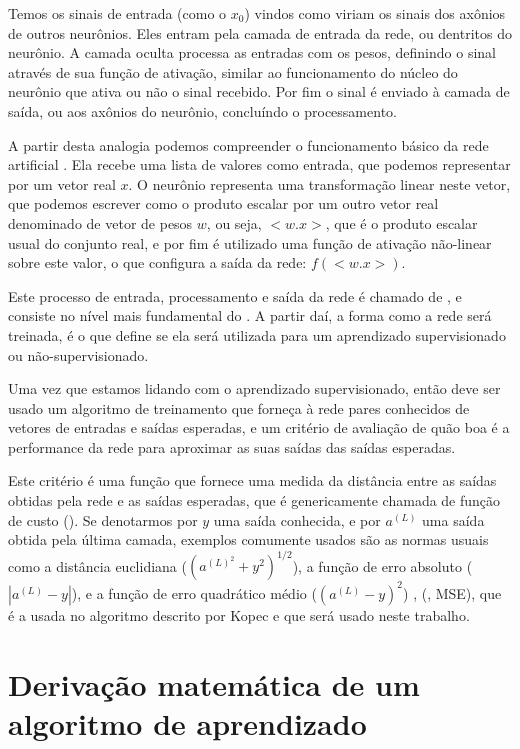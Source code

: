 Temos os sinais de entrada (como o $x_0$) vindos como viriam os sinais dos axônios de outros neurônios. Eles entram pela camada de entrada da rede, ou dentritos do neurônio. A camada oculta processa as entradas com os pesos, definindo o sinal através de sua função de ativação, similar ao funcionamento do núcleo do neurônio que ativa ou não o sinal recebido. Por fim o sinal é enviado à camada de saída, ou aos axônios do neurônio, concluíndo o processamento.

A partir desta analogia podemos compreender o funcionamento básico da rede artificial . Ela recebe uma lista de valores como entrada, que podemos representar por um vetor real $x$. O neurônio representa uma transformação linear neste vetor, que podemos escrever como o produto escalar por um outro vetor real denominado de vetor de pesos $w$, ou seja, $<w.x>$, que é o produto escalar usual do conjunto real, e por fim é utilizado uma função de ativação não-linear sobre este valor, o que configura a saída da rede: $f(<w.x>)$.

Este processo de entrada, processamento e saída da rede é chamado de , e consiste no nível mais fundamental do . A partir daí, a forma como a rede será treinada, é o que define se ela será utilizada para um aprendizado supervisionado ou não-supervisionado.

Uma vez que estamos lidando com o aprendizado supervisionado, então deve ser usado um algoritmo de treinamento que forneça à rede pares conhecidos de vetores de entradas e saídas esperadas, e um critério de avaliação de quão boa é a performance da rede para aproximar as suas saídas das saídas esperadas. 

Este critério é uma função que fornece uma medida da distância entre as saídas obtidas pela rede e as saídas esperadas, que é genericamente chamada de função de custo (). Se denotarmos por $y$ uma saída conhecida, e por $a^{(L)}$ uma saída obtida pela última camada, exemplos comumente usados são as normas usuais como a distância euclidiana ($(a^{(L)^2} + y^2)^{1/2}$), a função de erro absoluto ($|a^{(L)} - y|$), e a função de erro quadrático médio ($(a^{(L)} - y)^2$) , (, MSE), que é a usada no algoritmo descrito por Kopec \citep{classic} e que será usado neste trabalho.

\section{Derivação matemática de um algoritmo de aprendizado}

